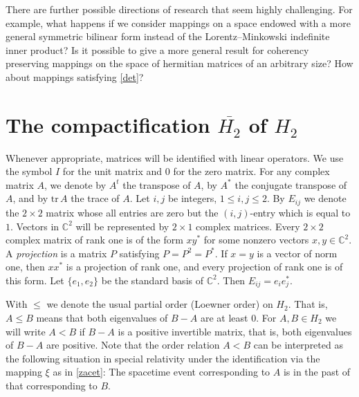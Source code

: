 \documentclass[10pt]{amsart}
\theoremstyle{definition}
\theoremstyle{remark}
\numberwithin{subsection}{section}
\numberwithin{equation}{section}
\newcommand\oH{{\overline{H_2}}}
\begin{document}
There are further possible directions of research that seem highly challenging. 
For example, what happens if we consider mappings on a space endowed with a more general symmetric bilinear form instead of the Lorentz--Minkowski indefinite inner product?
Is it possible to give a more general result for coherency preserving mappings on the space of hermitian matrices of an arbitrary size?
How about mappings satisfying \eqref{det}?








\section{The compactification $\oH$ of $H_2$}\label{compactification}
Whenever appropriate, matrices will be identified with linear operators.
We use the symbol $I$  for the unit matrix and $0$ for the zero matrix.
For any complex matrix $A$, we denote by $A^t$  the transpose of $A$, by $A^\ast$  the conjugate transpose of $A$, and by $\mathrm{tr}\, A$  the trace of $A$. Let $i,j$ be integers,
$1 \le i,j \le 2$. By $E_{ij}$  we denote the $2 \times 2$ matrix whose all entries are zero but the $(i,j)$-entry which is equal to $1$.
Vectors in $\mathbb{C}^2$ will be represented by $2 \times 1$ complex matrices. Every $2 \times 2$ complex matrix of rank one is of the form $xy^\ast$ for some nonzero vectors
$x,y \in \mathbb{C}^2$. 
A \emph{projection}  is a matrix $P$ satisfying $P=P^2=P^*$.
If $x = y$ is a vector of norm one, then $xx^\ast$ is a projection of rank one, and every projection of rank one is of this form. Let $\{ e_1 ,  e_2 \}$ be the standard basis of $\mathbb{C}^2$. Then $E_{ij} = e_i e_{j}^\ast$.

With $\le$ \index{$\le$} we denote the usual partial order (Loewner order) on $H_2$. That is, $A\leq B$ means that both eigenvalues of $B-A$ are at least $0$.
For $A,B \in H_2$ we will write $A < B$ \index{$<$} if $B-A$ is a positive invertible matrix, that is, both eigenvalues of $B-A$ are positive.
Note that the order relation $A<B$ can be interpreted as the following situation in special relativity under the identification via the mapping $\xi$ as in \eqref{zacet}: 
The spacetime event corresponding to $A$ is in the past of that corresponding to $B$.
\end{document}
